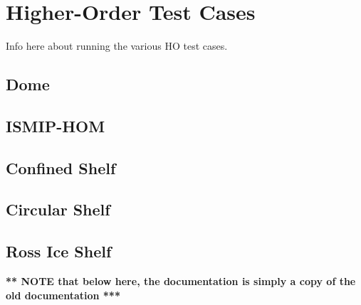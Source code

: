 
\section{Higher-Order Test Cases}

Info here about running the various HO test cases.

\subsection{Dome}

\subsection{ISMIP-HOM}

\subsection{Confined Shelf}

\subsection{Circular Shelf}

\subsection{Ross Ice Shelf}



\textbf{ \Large *** NOTE that below here, the documentation is simply a copy of the old documentation ***}